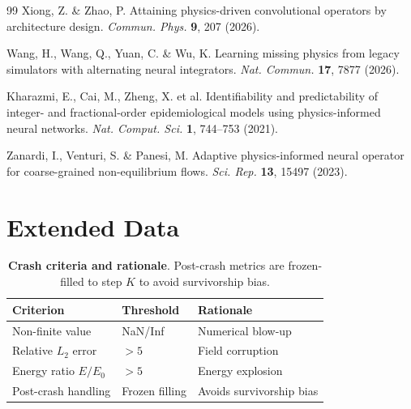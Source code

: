 \documentclass[11pt,a4paper]{article}
\begin{document}
\begin{thebibliography}{99}
 Xiong, Z. \& Zhao, P. Attaining physics-driven convolutional operators by architecture design. \emph{Commun. Phys.} \textbf{9}, 207 (2026).

 Wang, H., Wang, Q., Yuan, C. \& Wu, K. Learning missing physics from legacy simulators with alternating neural integrators. \emph{Nat. Commun.} \textbf{17}, 7877 (2026).

 Kharazmi, E., Cai, M., Zheng, X. et al. Identifiability and predictability of integer- and fractional-order epidemiological models using physics-informed neural networks. \emph{Nat. Comput. Sci.} \textbf{1}, 744--753 (2021).

 Zanardi, I., Venturi, S. \& Panesi, M. Adaptive physics-informed neural operator for coarse-grained non-equilibrium flows. \emph{Sci. Rep.} \textbf{13}, 15497 (2023).

\end{thebibliography}

\clearpage

\section*{Extended Data}

\setcounter{table}{0}

\renewcommand{\thetable}{Extended Data Table \arabic{table}}

\setcounter{figure}{0}

\renewcommand{\thefigure}{Extended Data Fig. \arabic{figure}}



\begin{table}[htbp]
\centering\small
\caption{\textbf{Crash criteria and rationale}. Post-crash metrics are frozen-filled to step $K$ to avoid survivorship bias.}
\label{tab:crash}
\begin{tabular}{lll}
\toprule
Criterion & Threshold & Rationale \\
\midrule
Non-finite value & NaN/Inf & Numerical blow-up \\
Relative $L_2$ error & $>5$ & Field corruption \\
Energy ratio $E/E_0$ & $>5$ & Energy explosion \\
Post-crash handling & Frozen filling & Avoids survivorship bias \\
\bottomrule
\end{tabular}
\end{table}
\end{document}
